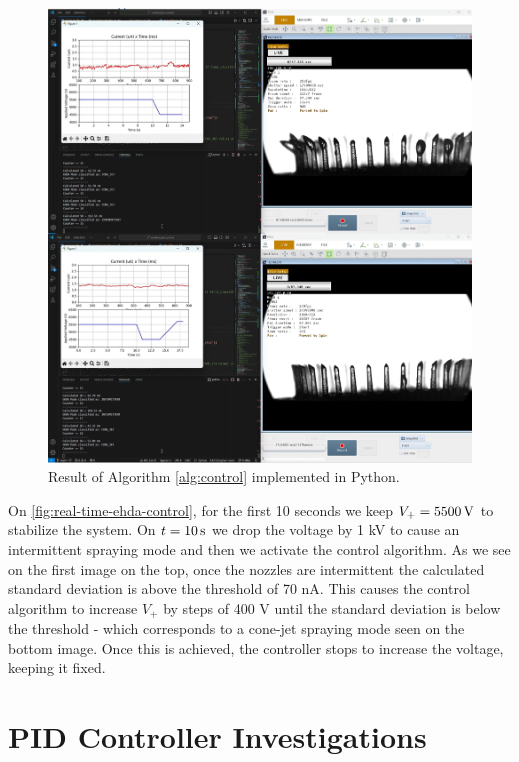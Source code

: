 \documentclass[oneside,12pt]{article}
\begin{document}
\begin{figure}[h!]
    \centering
    \includegraphics[width=\textwidth,trim=1 1 1 1,clip]{figures/real-time-ehda-control.png}
    \caption{Result of Algorithm \ref{alg:control} implemented in Python.}
    \label{fig:real-time-ehda-control}
\end{figure}

On \autoref{fig:real-time-ehda-control}, for the first 10 seconds we keep $V_+ = 5500 \,\mathrm{V}$ to stabilize the system.
On $t = 10 \,\mathrm{s}$ we drop the voltage by 1 kV to cause an intermittent spraying mode and then we activate the control algorithm. 
As we see on the first image on the top, once the nozzles are intermittent the calculated standard deviation is above the threshold of
70 nA. This causes the control algorithm to increase $V_+$ by steps of 400 V until the standard deviation is below the threshold - which
corresponds to a cone-jet spraying mode seen on the bottom image.
Once this is achieved, the controller stops to increase the voltage, keeping it fixed.  

\section{PID Controller Investigations}\label{sec:pid}
\end{document}
